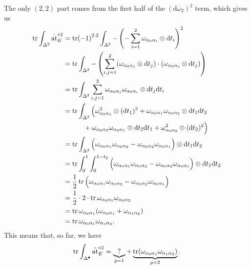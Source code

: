 \documentclass[11pt,fleqn]{article}
\theoremstyle{plain}
\theoremstyle{definition}
\theoremstyle{remark}
\numberwithin{equation}{theorem}
\newcommand{\at}{\mathrm{at}}
\newcommand{\simpexpat}[1]{\hat{\at}^{\circ#1}}
\renewcommand{\d}{\mathrm{d}}
\begin{document}
        The only $(2,2)$ part comes from the first half of the $(\d\overline{\omega}_2)^2$ term, which gives us
        \begin{align}
            \tr\int_{\Delta^2}\simpexpat{2}_E
            &= \tr(-1)^{2\cdot2}\int_{\Delta^2}-\left(-\sum_{i=1}^2\omega_{\alpha_0\alpha_i}\otimes\d t_i\right)^2
        \nonumber
        \\  &= \tr\int_{\Delta^2}-\left(\sum_{i,j=1}^2(\omega_{\alpha_0\alpha_j}\otimes\d t_j)\cdot(\omega_{\alpha_0\alpha_j}\otimes\d t_j)\right)
        \nonumber
        \\  &= \tr\int_{\Delta^2}\sum_{i,j=1}^2\omega_{\alpha_0\alpha_j}\omega_{\alpha_0\alpha_i}\otimes\d t_j\d t_i
        \nonumber
        \\  &= \tr\int_{\Delta^2}\Big(\omega_{\alpha_0\alpha_1}^2\otimes(\d t_1)^2 + \omega_{\alpha_0\alpha_1}\omega_{\alpha_0\alpha_2}\otimes\d t_1\d t_2
        \nonumber
        \\  &\qquad\quad+ \omega_{\alpha_0\alpha_2}\omega_{\alpha_0\alpha_1}\otimes\d t_2\d t_1 + \omega_{\alpha_0\alpha_2}^2\otimes(\d t_2)^2\Big)
        \nonumber
        \\  &= \tr\int_{\Delta^2} \Big(\omega_{\alpha_0\alpha_1}\omega_{\alpha_0\alpha_2} - \omega_{\alpha_0\alpha_2}\omega_{\alpha_0\alpha_1}\Big)\otimes\d t_1\d t_2
        \nonumber
        \\  &= \tr\int_0^1\int_0^{1-t_2} \Big(\omega_{\alpha_0\alpha_1}\omega_{\alpha_0\alpha_2} - \omega_{\alpha_0\alpha_2}\omega_{\alpha_0\alpha_1}\Big)\otimes\d t_1\d t_2
        \nonumber
        \\  &= \frac12\tr\Big(\omega_{\alpha_0\alpha_1}\omega_{\alpha_0\alpha_2} - \omega_{\alpha_0\alpha_2}\omega_{\alpha_0\alpha_1}\Big)
        \nonumber
        \\  &= \frac{1}{2}\cdot2\cdot\tr\omega_{\alpha_0\alpha_1}\omega_{\alpha_0\alpha_2}
        \nonumber
        \\  &= \tr\omega_{\alpha_0\alpha_1}(\omega_{\alpha_0\alpha_1}+\omega_{\alpha_1\alpha_2})
        \nonumber
        \\  &= \tr\omega_{\alpha_0\alpha_1}\omega_{\alpha_1\alpha_2}.
        \end{align}
        This means that, so far, we have
        \begin{equation*}
            \tr\int_{\Delta^\bullet}\simpexpat{2}_E = \underbrace{?}_{p=1} + \underbrace{\tr(\omega_{\alpha_0\alpha_1}\omega_{\alpha_1\alpha_2})}_{p=2}.
        \end{equation*}
\end{document}

